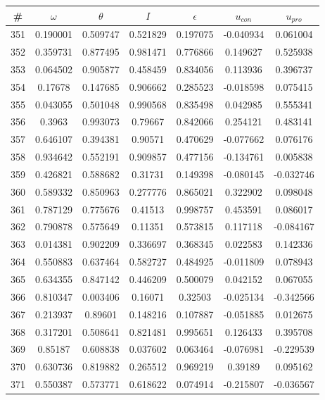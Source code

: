 \newpage
\begin{table}
\begin{tabular}{c|c|c|c|c|c|c}
\# & $\omega$ & $\theta$ & $I$ & $\epsilon$ & $u_{con}$ & $u_{pro}$\\
\hline
351 & 0.190001 & 0.509747 & 0.521829 & 0.197075 & -0.040934 & 0.061004\\
352 & 0.359731 & 0.877495 & 0.981471 & 0.776866 & 0.149627 & 0.525938\\
353 & 0.064502 & 0.905877 & 0.458459 & 0.834056 & 0.113936 & 0.396737\\
354 & 0.17678 & 0.147685 & 0.906662 & 0.285523 & -0.018598 & 0.075415\\
355 & 0.043055 & 0.501048 & 0.990568 & 0.835498 & 0.042985 & 0.555341\\
356 & 0.3963 & 0.993073 & 0.79667 & 0.842066 & 0.254121 & 0.483141\\
357 & 0.646107 & 0.394381 & 0.90571 & 0.470629 & -0.077662 & 0.076176\\
358 & 0.934642 & 0.552191 & 0.909857 & 0.477156 & -0.134761 & 0.005838\\
359 & 0.426821 & 0.588682 & 0.31731 & 0.149398 & -0.080145 & -0.032746\\
360 & 0.589332 & 0.850963 & 0.277776 & 0.865021 & 0.322902 & 0.098048\\
361 & 0.787129 & 0.775676 & 0.41513 & 0.998757 & 0.453591 & 0.086017\\
362 & 0.790878 & 0.575649 & 0.11351 & 0.573815 & 0.117118 & -0.084167\\
363 & 0.014381 & 0.902209 & 0.336697 & 0.368345 & 0.022583 & 0.142336\\
364 & 0.550883 & 0.637464 & 0.582727 & 0.484925 & -0.011809 & 0.078943\\
365 & 0.634355 & 0.847142 & 0.446209 & 0.500079 & 0.042152 & 0.067055\\
366 & 0.810347 & 0.003406 & 0.16071 & 0.32503 & -0.025134 & -0.342566\\
367 & 0.213937 & 0.89601 & 0.148216 & 0.107887 & -0.051885 & 0.012675\\
368 & 0.317201 & 0.508641 & 0.821481 & 0.995651 & 0.126433 & 0.395708\\
369 & 0.85187 & 0.608838 & 0.037602 & 0.063464 & -0.076981 & -0.229539\\
370 & 0.630736 & 0.819882 & 0.265512 & 0.969219 & 0.39189 & 0.095162\\
371 & 0.550387 & 0.573771 & 0.618622 & 0.074914 & -0.215807 & -0.036567\\

\end{tabular}
\end{table}
